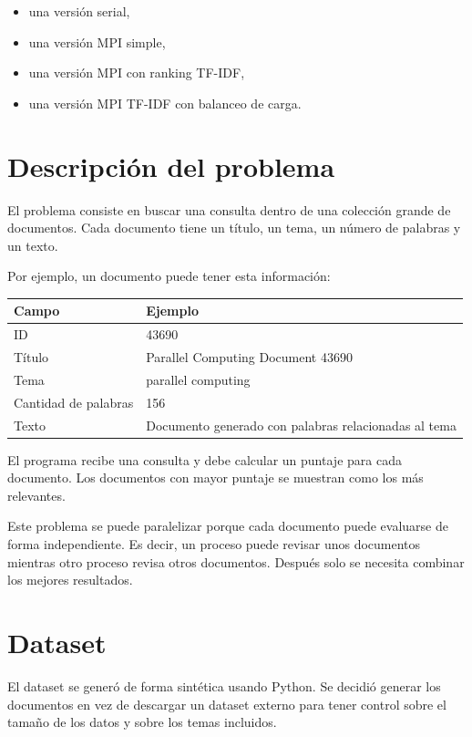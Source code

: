 \documentclass[12pt,letterpaper]{article}
\begin{document}
\begin{itemize}
\item una versión serial,
\item una versión MPI simple,
\item una versión MPI con ranking TF-IDF,
\item una versión MPI TF-IDF con balanceo de carga.
\end{itemize}

\section{Descripción del problema}

El problema consiste en buscar una consulta dentro de una colección grande de documentos. Cada documento tiene un título, un tema, un número de palabras y un texto.

Por ejemplo, un documento puede tener esta información:

\begin{center}
\begin{tabular}{ll}
\toprule
Campo & Ejemplo \\
\midrule
ID & 43690 \\
Título & Parallel Computing Document 43690 \\
Tema & parallel computing \\
Cantidad de palabras & 156 \\
Texto & Documento generado con palabras relacionadas al tema \\
\bottomrule
\end{tabular}
\end{center}

El programa recibe una consulta y debe calcular un puntaje para cada documento. Los documentos con mayor puntaje se muestran como los más relevantes.

Este problema se puede paralelizar porque cada documento puede evaluarse de forma independiente. Es decir, un proceso puede revisar unos documentos mientras otro proceso revisa otros documentos. Después solo se necesita combinar los mejores resultados.

\section{Dataset}

El dataset se generó de forma sintética usando Python. Se decidió generar los documentos en vez de descargar un dataset externo para tener control sobre el tamaño de los datos y sobre los temas incluidos.
\end{document}
